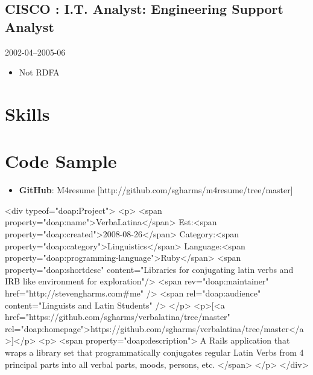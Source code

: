 \documentclass[]{article}
\begin{document}
\subsection*{CISCO : I.T. Analyst: Engineering Support Analyst}
  \label{cisco_rdfa_cisco_2_title:_rdfa_cisco_2_desc}
  2002-04--2005-06
\begin{itemize}
    \item Not RDFA
\end{itemize}
       


\section{Skills}










  \section*{ Code Sample }
   \begin{itemize}
     \item \textbf{GitHub}: M4resume [\textsf{http://github.com/sgharms/m4resume/tree/master}]
   \end{itemize}






  <div typeof="doap:Project">
		<p>
			<span property="doap:name">VerbaLatina</span> Est:<span property="doap:created">2008-08-26</span> 
			Category:<span property="doap:category">Linguistics</span>  Language:<span property="doap:programming-language">Ruby</span>
			<span property="doap:shortdesc" content="Libraries for conjugating latin verbs and IRB like environment for exploration"/>
			<span rev="doap:maintainer" href="http://stevengharms.com#me" />
			<span rel="doap:audience" content="Linguists and Latin Students" />
		</p>
		<p>[<a href="https://github.com/sgharms/verbalatina/tree/master" rel="doap:homepage">https://github.com/sgharms/verbalatina/tree/master</a>]</p>
		<p>
			<span property="doap:description">
				A Rails application that wraps a library set that programmatically conjugates regular Latin Verbs from 4 principal parts into all verbal parts, moods, persons, etc.
			</span>
		</p>	
</div>
\end{document}
